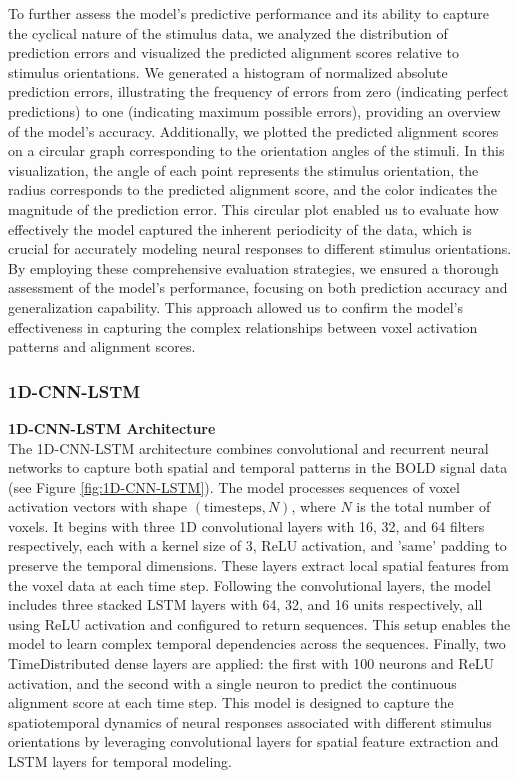 \documentclass[a4paper]{article}
\begin{document}
To further assess the model's predictive performance and its ability to capture the cyclical nature of the stimulus data, we analyzed the distribution of prediction errors and visualized the predicted alignment scores relative to stimulus orientations. We generated a histogram of normalized absolute prediction errors, illustrating the frequency of errors from zero (indicating perfect predictions) to one (indicating maximum possible errors), providing an overview of the model's accuracy. Additionally, we plotted the predicted alignment scores on a circular graph corresponding to the orientation angles of the stimuli. In this visualization, the angle of each point represents the stimulus orientation, the radius corresponds to the predicted alignment score, and the color indicates the magnitude of the prediction error. This circular plot enabled us to evaluate how effectively the model captured the inherent periodicity of the data, which is crucial for accurately modeling neural responses to different stimulus orientations. By employing these comprehensive evaluation strategies, we ensured a thorough assessment of the model's performance, focusing on both prediction accuracy and generalization capability. This approach allowed us to confirm the model's effectiveness in capturing the complex relationships between voxel activation patterns and alignment scores.

\subsubsection{\textbf{1D-CNN-LSTM}}
\noindent \textbf{1D-CNN-LSTM Architecture}\\
The 1D-CNN-LSTM architecture combines convolutional and recurrent neural networks to capture both spatial and temporal patterns in the BOLD signal data (see Figure \ref{fig:1D-CNN-LSTM}). The model processes sequences of voxel activation vectors with shape \((\text{timesteps}, N)\), where \(N\) is the total number of voxels. It begins with three 1D convolutional layers with 16, 32, and 64 filters respectively, each with a kernel size of 3, ReLU activation, and 'same' padding to preserve the temporal dimensions. These layers extract local spatial features from the voxel data at each time step. Following the convolutional layers, the model includes three stacked LSTM layers with 64, 32, and 16 units respectively, all using ReLU activation and configured to return sequences. This setup enables the model to learn complex temporal dependencies across the sequences. Finally, two TimeDistributed dense layers are applied: the first with 100 neurons and ReLU activation, and the second with a single neuron to predict the continuous alignment score at each time step. This model is designed to capture the spatiotemporal dynamics of neural responses associated with different stimulus orientations by leveraging convolutional layers for spatial feature extraction and LSTM layers for temporal modeling.\\
\end{document}
